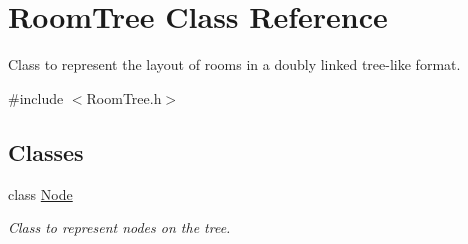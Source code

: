 \hypertarget{classRoomTree}{\section{Room\-Tree Class Reference}
\label{classRoomTree}
}


Class to represent the layout of rooms in a doubly linked tree-\/like format.  




{\ttfamily \#include $<$Room\-Tree.\-h$>$}

\subsection*{Classes}
\begin{DoxyCompactItemize}
\item 
class \hyperlink{classRoomTree_1_1Node}{Node}
\begin{DoxyCompactList}\small\item\em Class to represent nodes on the tree. \end{DoxyCompactList}\end{DoxyCompactItemize}
